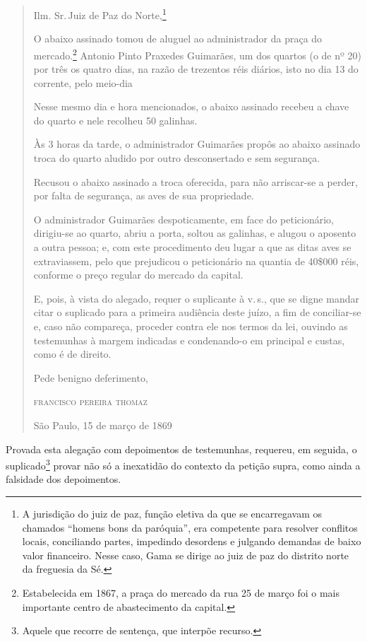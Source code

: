 \begin{quote}
Ilm. Sr.\,Juiz de Paz do Norte,\footnote{A jurisdição do juiz de paz,
  função eletiva da que se encarregavam os chamados ``homens bons da
  paróquia'', era competente para resolver conflitos locais, conciliando
  partes, impedindo desordens e julgando demandas de baixo valor
  financeiro. Nesse caso, Gama se dirige ao juiz de paz do distrito
  norte da freguesia da Sé.}

O abaixo assinado tomou de aluguel ao administrador da praça do
mercado.\footnote{Estabelecida em 1867, a praça do mercado da rua 25 de
  março foi o mais importante centro de abastecimento da capital.}
Antonio Pinto Praxedes Guimarães, um dos quartos (o de nº 20) por três
os quatro dias, na razão de trezentos réis diários, isto no dia 13 do
corrente, pelo meio-dia

Nesse mesmo dia e hora mencionados, o abaixo assinado recebeu a chave do
quarto e nele recolheu 50 galinhas.

Às 3 horas da tarde, o administrador Guimarães propôs ao abaixo assinado
troca do quarto aludido por outro desconsertado e sem segurança.

Recusou o abaixo assinado a troca oferecida, para não arriscar-se a
perder, por falta de segurança, as aves de sua propriedade.

O administrador Guimarães despoticamente, em face do peticionário,
dirigiu-se ao quarto, abriu a porta, soltou as galinhas, e alugou o
aposento a outra pessoa; e, com este procedimento deu lugar a que as
ditas aves se extraviassem, pelo que prejudicou o peticionário na
quantia de 40\$000 réis, conforme o preço regular do mercado da capital.

E, pois, à vista do alegado, requer o suplicante à v.\,s., que se digne
mandar citar o suplicado para a primeira audiência deste juízo, a fim de
conciliar-se e, caso não compareça, proceder contra ele nos termos da
lei, ouvindo as testemunhas à margem indicadas e condenando-o em
principal e custas, como é de direito.

Pede benigno deferimento,

\begin{flushright}
\textsc{francisco pereira thomaz}

São Paulo, 15 de março de 1869
\end{flushright}
\end{quote}

Provada esta alegação com depoimentos de testemunhas, requereu, em
seguida, o suplicado\footnote{Aquele que recorre de sentença, que
  interpõe recurso.} provar não só a inexatidão do contexto da petição
supra, como ainda a falsidade dos depoimentos.

